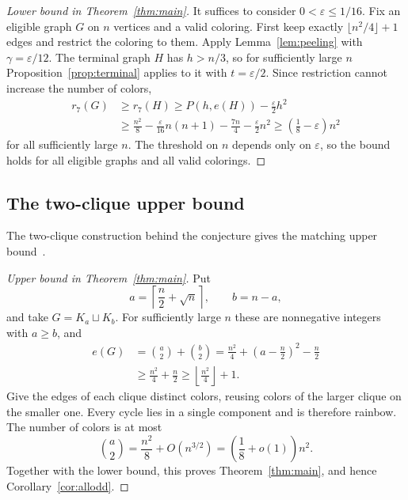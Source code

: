\begin{proof}[Lower bound in Theorem~\ref{thm:main}]
It suffices to consider $0<\varepsilon\le1/16$. Fix an eligible graph $G$ on $n$ vertices and a valid coloring. First keep exactly $\lfloor n^2/4\rfloor+1$ edges and restrict the coloring to them. Apply Lemma~\ref{lem:peeling} with $\gamma=\varepsilon/12$. The terminal graph $H$ has $h>n/3$, so for sufficiently large $n$ Proposition~\ref{prop:terminal} applies to it with $t=\varepsilon/2$. Since restriction cannot increase the number of colors,
\begin{align*}
 r_7(G)&\ge r_7(H)
 \ge P(h,e(H))-\frac{\varepsilon}{2}h^2\\
 &\ge\frac{n^2}{8}
 -\frac{\varepsilon}{16}n(n+1)-\frac{7n}{4}
 -\frac{\varepsilon}{2}n^2
 \ge\left(\frac18-\varepsilon\right)n^2
\end{align*}
for all sufficiently large $n$. The threshold on $n$ depends only on $\varepsilon$, so the bound holds for all eligible graphs and all valid colorings.
\end{proof}

\subsection{The two-clique upper bound}
The two-clique construction behind the conjecture gives the matching upper bound~\cite{BEGS1989,BCM2026}.

\begin{proof}[Upper bound in Theorem~\ref{thm:main}]
Put
\[
 a=\left\lceil\frac n2+\sqrt n\right\rceil,\qquad b=n-a,
\]
and take $G=K_a\sqcup K_b$. For sufficiently large $n$ these are nonnegative integers with $a\ge b$, and
\begin{align*}
 e(G)&=\binom a2+\binom b2
 =\frac{n^2}{4}+\left(a-\frac n2\right)^2-\frac n2\\
 &\ge\frac{n^2}{4}+\frac n2
 \ge\left\lfloor\frac{n^2}{4}\right\rfloor+1.
\end{align*}
Give the edges of each clique distinct colors, reusing colors of the larger clique on the smaller one. Every cycle lies in a single component and is therefore rainbow. The number of colors is at most
\[
 \binom a2=\frac{n^2}{8}+O(n^{3/2})
 =\left(\frac18+o(1)\right)n^2.
\]
Together with the lower bound, this proves Theorem~\ref{thm:main}, and hence Corollary~\ref{cor:allodd}.
\end{proof}
